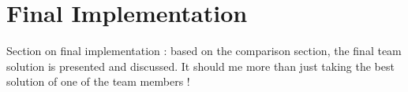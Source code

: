 \documentclass[final]{report}
\begin{document}
\chapter{Final Implementation}
Section on final implementation : based on the comparison section, the final team solution is presented and discussed. It should me more than just taking the best solution of one of the team members !
\end{document}
